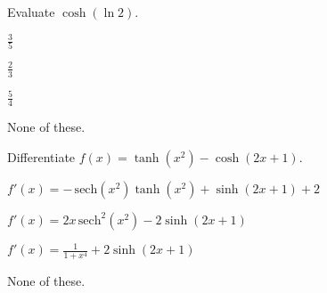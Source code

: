 \documentclass[12pt]{exam}
\newcommand{\<}{(}
\renewcommand{\>}{)}
\begin{document}
\begin{center}
\end{center}
\vspace{0.1in}

\vspace{12pt}

\begin{questions}

\question
Evaluate \(\cosh(\ln 2)\).
\begin{choices}
\item \(\frac{3}{5}\)
\item \(\frac{2}{3}\)
\item \(\frac{5}{4}\)
\item None of these.
\end{choices}

\newcommand{\sech}{\,\mathrm{sech}}
\question
Differentiate \(f(x)=\tanh(x^2)-\cosh(2x+1)\).
\begin{choices}
\item \(f'(x)=-\sech(x^2)\tanh(x^2)+\sinh(2x+1)+2\)
\item \(f'(x)=2x\sech^2(x^2)-2\sinh(2x+1)\)
\item \(f'(x)=\frac{1}{1+x^4}+2\sinh(2x+1)\)
\item None of these.
\end{choices}



\end{questions}
\end{document}
